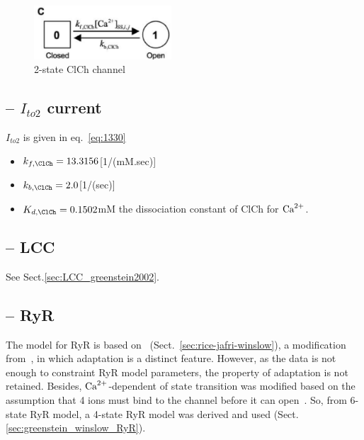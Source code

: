 \begin{figure}[hbt]
  \centerline{\includegraphics[height=2cm,
    angle=0]{./images/Greenstein_ClCh.eps}}
\caption{2-state ClCh channel}
\label{fig:Greenstein_ClCh}
\end{figure}

\subsection{-- $I_{to2}$ current}

$I_{to2}$ is given in eq.~\eqref{eq:1330}
\begin{itemize}
\item $k_{f,\ClCh}=13.3156$[1/(mM.sec)]
\item $k_{b,\ClCh}=2.0$[1/(sec)]

\item $K_{d,\ClCh}=0.1502$mM the dissociation constant of ClCh for
  ${\text{Ca}^{2+}}$.
\end{itemize}


\subsection{-- LCC}
\label{sec:lcc}

See Sect.\ref{sec:LCC_greenstein2002}.

\subsection{-- RyR}

The model for RyR is based on~\citep{rice1999mgg}
(Sect.~\ref{sec:rice-jafri-winslow}), a modification from~\citep{keizer1998}, in
which adaptation is a distinct feature. However, as the data is not enough to
constraint RyR model parameters, the property of adaptation is not retained. 
Besides, ${\text{Ca}^{2+}}$-dependent of state transition was modified based on the
assumption that 4 ions must bind to the channel before it can
open~\citep{zahradnikova1999}. So, from 6-state RyR model, a 4-state RyR model
was derived and used (Sect.\ref{sec:greenstein_winslow_RyR}).

